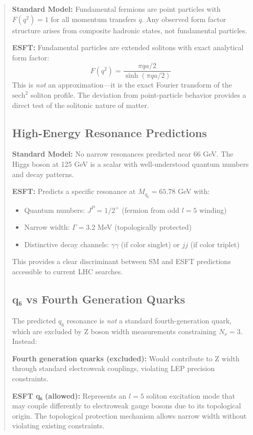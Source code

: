 ﻿\documentclass[twocolumn,prd,amsmath,amssymb,aps]{revtex4-2}
\begin{document}
\begin{abstract}
\textbf{Standard Model:} Fundamental fermions are point particles with $F(q^2) = 1$ for all momentum transfers $q$. Any observed form factor structure arises from composite hadronic states, not fundamental particles.

\textbf{ESFT:} Fundamental particles are extended solitons with exact analytical form factor:
\begin{equation}
F(q^2) = \frac{\pi qa/2}{\sinh(\pi qa/2)}
\end{equation}
This is \emph{not} an approximation---it is the exact Fourier transform of the $\text{sech}^2$ soliton profile. The deviation from point-particle behavior provides a direct test of the solitonic nature of matter.

\subsection{High-Energy Resonance Predictions}

\textbf{Standard Model:} No narrow resonances predicted near 66 GeV. The Higgs boson at 125 GeV is a scalar with well-understood quantum numbers and decay patterns.

\textbf{ESFT:} Predicts a specific resonance at $M_{q_6} = 65.78$ GeV with:
\begin{itemize}
\item Quantum numbers: $J^P = 1/2^+$ (fermion from odd $l=5$ winding)
\item Narrow width: $\Gamma = 3.2$ MeV (topologically protected)
\item Distinctive decay channels: $\gamma\gamma$ (if color singlet) or $jj$ (if color triplet)
\end{itemize}
This provides a clear discriminant between SM and ESFT predictions accessible to current LHC searches.

\subsection{q₆ vs Fourth Generation Quarks}

The predicted $q_6$ resonance is \emph{not} a standard fourth-generation quark, which are excluded by Z boson width measurements constraining $N_\nu = 3$. Instead:

\textbf{Fourth generation quarks (excluded):} Would contribute to Z width through standard electroweak couplings, violating LEP precision constraints.

\textbf{ESFT q₆ (allowed):} Represents an $l=5$ soliton excitation mode that may couple differently to electroweak gauge bosons due to its topological origin. The topological protection mechanism allows narrow width without violating existing constraints.


\end{abstract}
\end{document}
